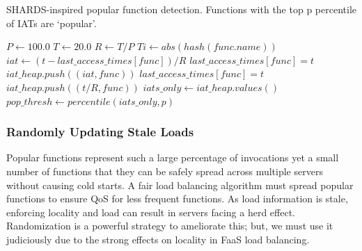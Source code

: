 
\begin{algorithm}
\caption{SHARDS-inspired popular function detection. Functions with the top p percentile of IATs are `popular'.}
\begin{algorithmic}[1]

 \State $P \gets 100.0$
 \State $T \gets 20.0$ 
 \State $R \gets T / P$ 
 \State $Ti \gets abs(hash(func.name))$ 
  \State $iat \gets (t-last\_access\_times[func])/R$
  \State $last\_access\_times[func] = t$ 
  \State $iat\_heap.push((iat, func))$
  \Else
  \State $last\_access\_times[func] = t$
  \State $iat\_heap.push((t/R, func))$
  \EndIf
 \EndIf
 \State $iats\_only \gets iat\_heap.values()$
 \State $pop\_thresh \gets percentile(iats\_only, p)$
\EndProcedure
\end{algorithmic}
\label{algo:shards-popular}
\end{algorithm}

\subsubsection{Randomly Updating Stale Loads}
\label{subsec:random-stale-loads}

Popular functions represent such a large percentage of invocations yet a small number of functions that they can be safely spread across multiple servers without causing cold starts.
A fair load balancing algorithm must spread popular functions to ensure QoS for less frequent functions. 
As load information is stale, enforcing locality and load can result in servers facing a herd effect.
Randomization is a powerful strategy to ameliorate this; but, we must use it judiciously due to the strong effects on locality in FaaS load balancing.

